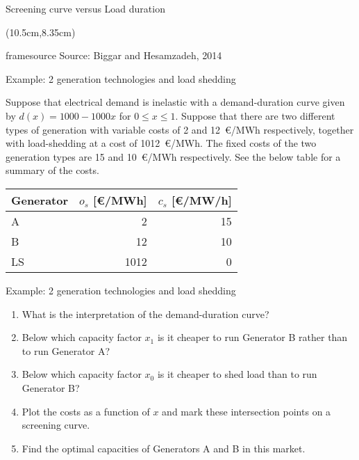 \documentclass[10pt,aspectratio=169,dvipsnames]{beamer}
\newcommand{\ra}[1]{\renewcommand{\arraystretch}{#1}}
\newcommand{\source}[1]{\begin{textblock*}{5cm}(10.5cm,8.35cm)
    \begin{beamercolorbox}[ht=0.5cm,right]{framesource}
        \usebeamerfont{framesource}\usebeamercolor[fg]{framesource} Source: {#1}
    \end{beamercolorbox}
\end{textblock*}}
\let\olditem\item
\renewcommand{\item}{%
\olditem\vspace{5pt}}
\begin{document}
\begin{frame}{Screening curve versus Load duration}


  \centering

  \source{Biggar and Hesamzadeh, 2014}
\end{frame}


\begin{frame}{Example: 2 generation technologies and load shedding}


Suppose that electrical demand is inelastic with a demand-duration curve given by $d(x)=1000-1000x$ for $0\leq x \leq 1$. Suppose that there are two different types of generation with variable costs of 2 and 12~\euro/MWh respectively, together with load-shedding at a cost of 1012~\euro/MWh. The fixed costs of the two generation types are 15 and 10~\euro/MWh respectively. See the below table for a summary of the costs.



  \ra{1.1}
  \begin{table}[!h]
    \begin{tabular}{lrr}
      \toprule
      Generator & $o_s$ [\euro/MWh] &  $c_s$ [\euro/MW/h] \\
      \midrule
      A & 2 & 15 \\
      B & 12 & 10 \\
      LS & 1012 & 0 \\
      \bottomrule
    \end{tabular}
  \end{table}


\end{frame}

\begin{frame}{Example: 2 generation technologies and load shedding}
\begin{enumerate}
  \item What is the interpretation of the demand-duration curve?
  \item Below which capacity factor $x_1$ is it cheaper to run Generator B rather than to run Generator A?
  \item Below which capacity factor $x_0$ is it cheaper to shed load than to run Generator B?
  \item Plot the costs as a function of
    $x$ and mark these intersection points on a screening curve.
  \item Find the optimal capacities of Generators A and B in this market.
\end{enumerate}
\end{frame}
\end{document}
